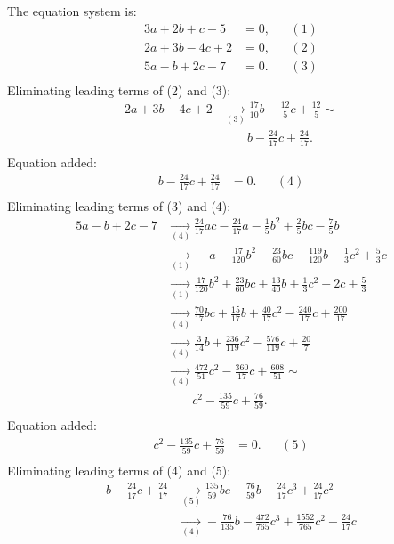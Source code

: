 {\scriptsize
The equation system is:
\begin{align*}
3a+2b+c-5&= 0, &&(1)\\
2a+3b-4c+2&= 0, &&(2)\\
5a-b+2c-7&= 0. &&(3)\\
\end{align*}
Eliminating leading terms of (2) and (3):
\begin{align*}
2a+3b-4c+2&\underset{(3)}{\rightarrow}\frac{17}{10}b-\frac{12}{5}c+\frac{12}{5}
\sim \\ &\qquad b-\frac{24}{17}c+\frac{24}{17}
.\\ \end{align*}
Equation added:
\begin{align*}
b-\frac{24}{17}c+\frac{24}{17}&= 0. &&(4)\\
\end{align*}
Eliminating leading terms of (3) and (4):
\begin{align*}
5a-b+2c-7&\underset{(4)}{\rightarrow}\frac{24}{17}ac-\frac{24}{17}a-\frac{1}{5}b^{2}+\frac{2}{5}bc-\frac{7}{5}b
\\ &\underset{(1)}{\rightarrow}-a-\frac{17}{120}b^{2}-\frac{23}{60}bc-\frac{119}{120}b-\frac{1}{3}c^{2}+\frac{5}{3}c
\\ &\underset{(1)}{\rightarrow}\frac{17}{120}b^{2}+\frac{23}{60}bc+\frac{13}{40}b+\frac{1}{3}c^{2}-2c+\frac{5}{3}
\\ &\underset{(4)}{\rightarrow}\frac{70}{17}bc+\frac{15}{17}b+\frac{40}{17}c^{2}-\frac{240}{17}c+\frac{200}{17}
\\ &\underset{(4)}{\rightarrow}\frac{3}{14}b+\frac{236}{119}c^{2}-\frac{576}{119}c+\frac{20}{7}
\\ &\underset{(4)}{\rightarrow}\frac{472}{51}c^{2}-\frac{360}{17}c+\frac{608}{51}
\sim \\ &\qquad c^{2}-\frac{135}{59}c+\frac{76}{59}
.\\ \end{align*}
Equation added:
\begin{align*}
c^{2}-\frac{135}{59}c+\frac{76}{59}&= 0. &&(5)\\
\end{align*}
Eliminating leading terms of (4) and (5):
\begin{align*}
b-\frac{24}{17}c+\frac{24}{17}&\underset{(5)}{\rightarrow}\frac{135}{59}bc-\frac{76}{59}b-\frac{24}{17}c^{3}+\frac{24}{17}c^{2}
\\ &\underset{(4)}{\rightarrow}-\frac{76}{135}b-\frac{472}{765}c^{3}+\frac{1552}{765}c^{2}-\frac{24}{17}c

\end{align*}}
